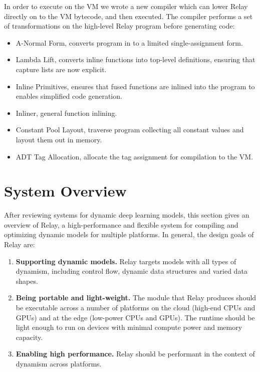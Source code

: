 In order to execute on the VM we wrote a new compiler which
  can lower Relay directly on to the VM bytecode, and then
  executed.
The compiler performs a set of transformations on the high-level
  Relay program before generating code:
\begin{itemize}
  \item A-Normal Form, converts program in to a limited single-assignment form.
  \item Lambda Lift, converts inline functions into top-level definitions,
        ensuring that capture lists are now explicit.
  \item Inline Primitives, ensures that fused functions are inlined into
        the program to enables simplified code generation.
  \item Inliner, general function inlining.
  \item Constant Pool Layout, traverse program collecting all constant values
        and layout them out in memory.
  \item ADT Tag Allocation, allocate the tag assignment for compilation
        to the VM.
\end{itemize}


\section{System Overview}
\label{sec:Relay-overview}


After reviewing systems for dynamic deep learning models, this section gives an overview of Relay, a high-performance and flexible system for compiling and optimizing dynamic models for multiple platforms. In general, the design goals of Relay are:
\begin{enumerate}[leftmargin=*]
    \itemsep 0em
    \item {\bf Supporting dynamic models.} Relay targets models with all types of dynamism, including control flow, dynamic data structures and varied data shapes.
    \item {\bf Being portable and light-weight.} The module that Relay produces should be executable across a number of platforms on the cloud (high-end CPUs and GPUs) and at the edge (low-power CPUs and GPUs). The runtime should be light enough to run on devices with minimal compute power and memory capacity.
    \item {\bf Enabling high performance.} Relay should be performant in the context of dynamism across platforms.
\end{enumerate}

